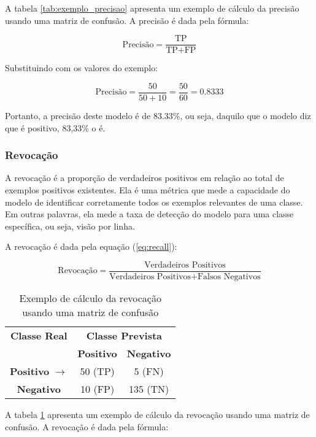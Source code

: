 A tabela \ref{tab:exemplo_precisao} apresenta um exemplo de cálculo da precisão usando uma matriz de confusão. A precisão é dada pela fórmula:

\[ \text{Precisão} = \frac{\text{TP}}{\text{TP} + \text{FP}} \]

Substituindo com os valores do exemplo:

\[ \text{Precisão} = \frac{50}{50 + 10} = \frac{50}{60} = 0.8333 \]

Portanto, a precisão deste modelo é de 83.33\%, ou seja, daquilo que o modelo diz que é positivo, 83,33\% o é.

\subsubsection{Revocação}

A revocação é a proporção de verdadeiros positivos em relação ao total de exemplos positivos existentes. Ela é uma métrica que mede a capacidade do modelo de identificar corretamente todos os exemplos relevantes de uma classe. Em outras palavras, ela mede a taxa de detecção do modelo para uma classe específica, ou seja, visão por linha.

A revocação é dada pela equação (\ref{eq:recall}):

\begin{equation}
\text{Revocação} = \frac{\text{Verdadeiros Positivos}}{\text{Verdadeiros Positivos} + \text{Falsos Negativos}} \label{eq:recall}
\end{equation}

\begin{table}[h]
\centering
\caption{Exemplo de cálculo da revocação usando uma matriz de confusão}
\label{tab:exemplo_revocacao}
\begin{tabular}{c|cc}
\multicolumn{1}{c}{\textbf{Classe Real}} & \multicolumn{2}{c}{\textbf{Classe Prevista}} \\ \cline{2-3}
\multicolumn{1}{c}{} & \textbf{Positivo}  & \textbf{Negativo} \\ \hline
\multicolumn{1}{c}{\textbf{Positivo} $\rightarrow$} & \cellcolor{green!25}50 (TP) & \cellcolor{red!25}5 (FN) \\
\multicolumn{1}{c}{\textbf{Negativo}} & \cellcolor{red!25}10 (FP)  & \cellcolor{green!25}135 (TN) \\ \hline
\end{tabular}
\end{table}

A tabela \ref{tab:exemplo_revocacao} apresenta um exemplo de cálculo da revocação usando uma matriz de confusão. A revocação é dada pela fórmula:

